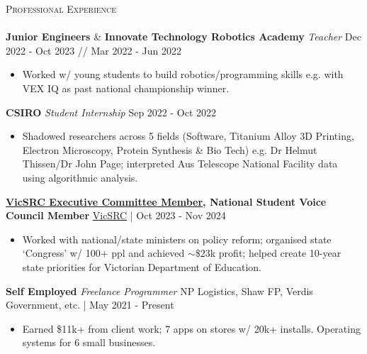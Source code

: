 \documentclass[a4paper]{article}
\newcommand{\lineunder} {
    \vspace*{-8pt} \\
    \hspace*{-10pt} \hrulefill \\
}
\newcommand{\header} [1] {
    {\hspace*{-10pt}\vspace*{6pt} \large\textsc{#1}}
    \vspace*{-6pt} \lineunder
}
\begin{document}
\vspace*{1mm}
\header{Professional Experience}

\textbf{Junior Engineers} \& \textbf{Innovate Technology Robotics Academy} \textit{Teacher} \hfill Dec 2022 - Oct 2023 // Mar 2022 - Jun 2022\\
\vspace{-3.5mm}
\begin{itemize} \itemsep 0.5pt
    \item Worked w/ young students to build robotics/programming skills e.g. with VEX IQ as past national championship winner.
\end{itemize}
\vspace{-2.5mm}

\textbf{CSIRO} \textit{Student Internship} \hfill Sep 2022 - Oct 2022\\
\vspace{-3.5mm}
\begin{itemize} \itemsep 0.5pt
\item Shadowed researchers across 5 fields (Software, Titanium Alloy 3D Printing, Electron Microscopy, Protein Synthesis \& Bio Tech) e.g. Dr Helmut Thissen/Dr John Page; interpreted Aus Telescope National Facility data using algorithmic analysis.
\end{itemize}
\vspace{-2.5mm}

\textbf{\href{https://vicsrc.org.au/about/executive-committee}{\ul{VicSRC Executive Committee Member}}, National Student Voice Council Member} \hfill \href{https://vicsrc.org.au/}{VicSRC} | Oct 2023 - Nov 2024\\
\vspace{-3.5mm}
\begin{itemize} \itemsep 0.5pt
\item Worked with national/state ministers on policy reform; organised state ‘Congress’ w/ 100+ ppl and achieved $\sim$\$23k profit; helped create 10-year state priorities for Victorian Department of Education.
\end{itemize}
\vspace{-2.5mm}

\textbf{Self Employed} \textit{Freelance Programmer} \hfill NP Logistics, Shaw FP, Verdis Government, etc. | May 2021 - Present\\
\vspace{-3.5mm}
\begin{itemize} \itemsep 0.5pt
\item Earned \$11k+ from client work; 7 apps on stores w/ 20k+ installs. Operating systems for 6 small businesses.
\end{itemize}
\vspace{-2.5mm}
\end{document}
